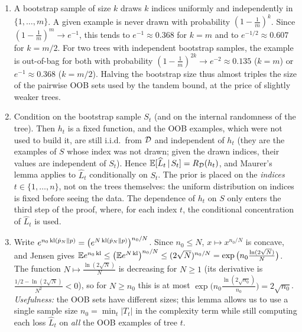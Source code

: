 \documentclass[11pt]{article}
\begin{document}
\begin{solution}
\begin{enumerate}
\item A bootstrap sample of size $k$ draws $k$ indices uniformly and independently in $\{1,\dots,m\}$. A given example
      is never drawn with probability $(1-\frac1m)^k$. Since $(1-\frac1m)^m\to e^{-1}$, this tends to
      $e^{-1}\approx0.368$ for $k=m$ and to $e^{-1/2}\approx0.607$ for $k=m/2$. For two trees with independent bootstrap
      samples, the example is out-of-bag for both with probability $(1-\frac1m)^{2k}\to e^{-2}\approx0.135$ ($k=m$) or
      $e^{-1}\approx0.368$ ($k=m/2$). Halving the bootstrap size thus almost triples the size of the pairwise OOB sets
      used by the tandem bound, at the price of slightly weaker trees.
\item Condition on the bootstrap sample $S_t$ (and on the internal randomness of the tree). Then $h_t$ is a fixed
      function, and the OOB examples, which were not used to build it, are still i.i.d.\ from $\mathcal{D}$ and independent of
      $h_t$ (they are the examples of $S$ whose index was not drawn; given the drawn indices, their values are
      independent of $S_t$). Hence $\mathbb{E}[\widehat L_t\,|\,S_t]=R_{\mathcal{D}}(h_t)$, and Maurer's lemma applies to $\widehat L_t$
      conditionally on $S_t$. The prior is placed on the \emph{indices} $t\in\{1,\dots,n\}$, not on the trees themselves:
      the uniform distribution on indices is fixed before seeing the data. The dependence of $h_t$ on $S$ only enters the
      third step of the proof, where, for each index $t$, the conditional concentration of $\widehat L_t$ is used.
\item Write $e^{n_0\operatorname{kl}(\hat p_N\|p)}=\big(e^{N\operatorname{kl}(\hat p_N\|p)}\big)^{n_0/N}$. Since $n_0\leq N$, $x\mapsto x^{n_0/N}$ is concave,
      and Jensen gives $\mathbb{E} e^{n_0\operatorname{kl}}\leq\big(\mathbb{E} e^{N\operatorname{kl}}\big)^{n_0/N}\leq(2\sqrt N)^{n_0/N}=\exp\big(n_0\frac{\ln(2\sqrt N)}{N}\big)$.
      The function $N\mapsto\frac{\ln(2\sqrt N)}N$ is decreasing for $N\geq1$ (its derivative is $\frac{1/2-\ln(2\sqrt N)}{N^2}<0$),
      so for $N\geq n_0$ this is at most $\exp\big(n_0\frac{\ln(2\sqrt{n_0})}{n_0}\big)=2\sqrt{n_0}$. \emph{Usefulness:} the OOB sets
      have different sizes; this lemma allows us to use a single sample size $n_0=\min_t|T_t|$ in the complexity term
      while still computing each loss $\widehat L_t$ on \emph{all} the OOB examples of tree $t$.
\end{enumerate}
\end{solution}
\end{document}

